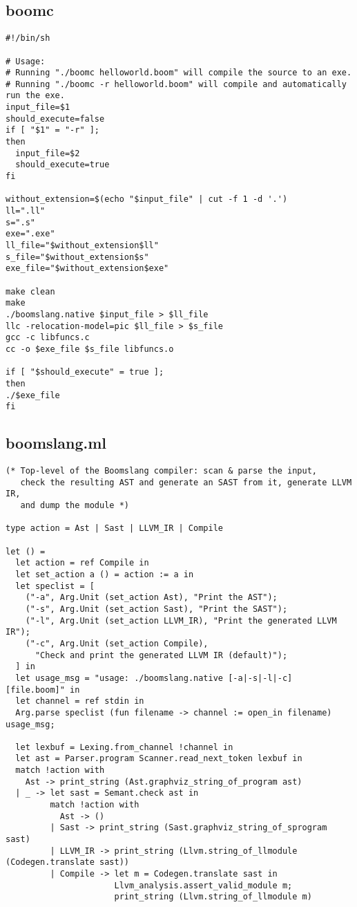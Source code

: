 \documentclass{article}
\begin{document}
\subsection{boomc}
\begin{verbatim}
#!/bin/sh

# Usage:
# Running "./boomc helloworld.boom" will compile the source to an exe.
# Running "./boomc -r helloworld.boom" will compile and automatically run the exe.
input_file=$1
should_execute=false
if [ "$1" = "-r" ];
then
  input_file=$2
  should_execute=true
fi

without_extension=$(echo "$input_file" | cut -f 1 -d '.')
ll=".ll"
s=".s"
exe=".exe"
ll_file="$without_extension$ll"
s_file="$without_extension$s"
exe_file="$without_extension$exe"

make clean
make
./boomslang.native $input_file > $ll_file
llc -relocation-model=pic $ll_file > $s_file
gcc -c libfuncs.c 
cc -o $exe_file $s_file libfuncs.o

if [ "$should_execute" = true ];
then
./$exe_file
fi
\end{verbatim}



\subsection{boomslang.ml}
\begin{verbatim}
(* Top-level of the Boomslang compiler: scan & parse the input,
   check the resulting AST and generate an SAST from it, generate LLVM IR,
   and dump the module *)

type action = Ast | Sast | LLVM_IR | Compile

let () =
  let action = ref Compile in
  let set_action a () = action := a in
  let speclist = [
    ("-a", Arg.Unit (set_action Ast), "Print the AST");
    ("-s", Arg.Unit (set_action Sast), "Print the SAST");
    ("-l", Arg.Unit (set_action LLVM_IR), "Print the generated LLVM IR");
    ("-c", Arg.Unit (set_action Compile),
      "Check and print the generated LLVM IR (default)");
  ] in
  let usage_msg = "usage: ./boomslang.native [-a|-s|-l|-c] [file.boom]" in
  let channel = ref stdin in
  Arg.parse speclist (fun filename -> channel := open_in filename) usage_msg;
     
  let lexbuf = Lexing.from_channel !channel in
  let ast = Parser.program Scanner.read_next_token lexbuf in
  match !action with
    Ast -> print_string (Ast.graphviz_string_of_program ast)
  | _ -> let sast = Semant.check ast in
         match !action with
           Ast -> ()
         | Sast -> print_string (Sast.graphviz_string_of_sprogram sast)
         | LLVM_IR -> print_string (Llvm.string_of_llmodule (Codegen.translate sast))
         | Compile -> let m = Codegen.translate sast in
                      Llvm_analysis.assert_valid_module m;
                      print_string (Llvm.string_of_llmodule m)
\end{verbatim}
\end{document}
